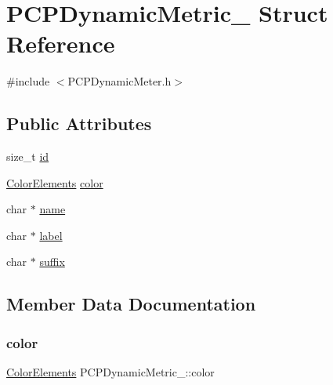 \hypertarget{structPCPDynamicMetric__}{}\section{P\+C\+P\+Dynamic\+Metric\+\_\+ Struct Reference}
\label{structPCPDynamicMetric__}


{\ttfamily \#include $<$P\+C\+P\+Dynamic\+Meter.\+h$>$}

\subsection*{Public Attributes}
\begin{DoxyCompactItemize}
\item 
size\+\_\+t \hyperlink{structPCPDynamicMetric___a722e91b274163ef0c3e58648da55e9a9}{id}
\item 
\hyperlink{CRT_8h_acea6130e6974f0cffaa58bbcbf09372a}{Color\+Elements} \hyperlink{structPCPDynamicMetric___a67a3a5ad84303cca1b03b309da7268af}{color}
\item 
char $\ast$ \hyperlink{structPCPDynamicMetric___ad7365a1bc097c88126797a6d642f6210}{name}
\item 
char $\ast$ \hyperlink{structPCPDynamicMetric___a877a62665ab4299f70d20c6b5f5a4a69}{label}
\item 
char $\ast$ \hyperlink{structPCPDynamicMetric___aac4cc2a2312e50c5bd61137565299ee7}{suffix}
\end{DoxyCompactItemize}


\subsection{Member Data Documentation}
\mbox{\label{structPCPDynamicMetric___a67a3a5ad84303cca1b03b309da7268af}} 
\subsubsection{\texorpdfstring{color}{color}}
{\footnotesize\ttfamily \hyperlink{CRT_8h_acea6130e6974f0cffaa58bbcbf09372a}{Color\+Elements} P\+C\+P\+Dynamic\+Metric\+\_\+\+::color}

\mbox{\label{structPCPDynamicMetric___a722e91b274163ef0c3e58648da55e9a9}} 
